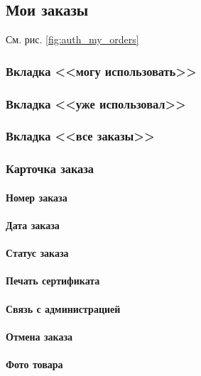         \subsection{Мои заказы}
        
            См. рис. \ref{fig:auth_my_orders}
     
        
            \subsubsection{Вкладка <<могу использовать>>}
            \subsubsection{Вкладка <<уже использовал>>}
            \subsubsection{Вкладка <<все заказы>>}
            \subsubsection{Карточка заказа}
                \paragraph{Номер заказа}
                \paragraph{Дата заказа}
                \paragraph{Статус заказа}
                \paragraph{Печать сертификата}
                \paragraph{Связь с администрацией}
                \paragraph{Отмена заказа}
                \paragraph{Фото товара}
